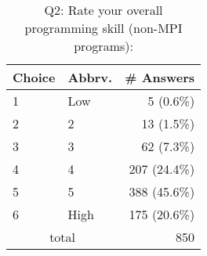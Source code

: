 \begin{table}[htb]%
\begin{center}%
\caption{Q2: Rate your overall programming skill (non-MPI programs):}%
\label{tab:Q2-ans}%
\begin{tabular}{l|l|r}%
\hline%
Choice & Abbrv. & \# Answers \\%
\hline%
1 & Low & 5 (0.6\%) \\%
2 & 2 & 13 (1.5\%) \\%
3 & 3 & 62 (7.3\%) \\%
4 & 4 & 207 (24.4\%) \\%
5 & 5 & 388 (45.6\%) \\%
6 & High & 175 (20.6\%) \\%
\hline%
\multicolumn{2}{c}{total} & 850 \\%
\hline%
\end{tabular}%
\end{center}%
\end{table}%

